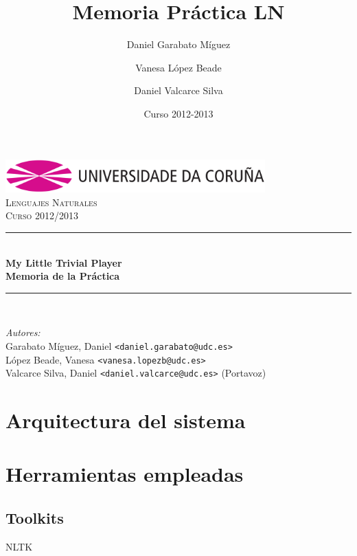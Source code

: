 \documentclass[12pt,a4paper,titlepage]{article}
\author{
	Daniel Garabato Míguez
	\and Vanesa López Beade
	\and Daniel Valcarce Silva
}
\title{Memoria Práctica LN}
\date{Curso 2012-2013}
\newcommand{\HRule}{\rule{\linewidth}{0.5mm}}
\begin{document}
\begin{titlepage}
\begin{center}
\includegraphics[width=10cm]{logo_udc}\\
\vspace{1cm}
\textsc{\Large Lenguajes Naturales}\\[0.5cm]
\textsc{\Large Curso 2012/2013}\\[0.5cm]

\HRule \\[0.4cm]
{ \huge \bfseries My Little Trivial Player}\\[0.4cm]
{ \Large \bfseries Memoria de la Práctica}\\[0cm]

\HRule \\[0cm]
\end{center}

\vfill
\emph{Autores:}
\vspace{0.5cm}
\\
\vspace{0.1cm}
Garabato Míguez, Daniel \texttt{<daniel.garabato@udc.es>}\\
\vspace{0.1cm}
López Beade, Vanesa \texttt{<vanesa.lopezb@udc.es>}\\
\vspace{0.1cm}
Valcarce Silva, Daniel \texttt{<daniel.valcarce@udc.es>} (Portavoz)\\

\end{titlepage}


\tableofcontents
\newpage

\section{Arquitectura del sistema}



\newpage
\section{Herramientas empleadas}

\subsection{Toolkits}
NLTK
\end{document}
